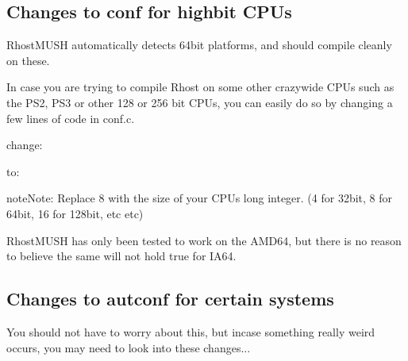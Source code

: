 \documentclass[letterpaper,10pt,english]{sphinxmanual}
\begin{document}
\subsection{Changes to conf for high\sphinxhyphen{}bit CPUs}
\label{\detokenize{troubleshooting:changes-to-conf-for-high-bit-cpus}}
\sphinxAtStartPar
RhostMUSH automatically detects 64\sphinxhyphen{}bit platforms, and should compile
cleanly on these.

\sphinxAtStartPar
In case you are trying to compile Rhost on some other crazy\sphinxhyphen{}wide CPUs
such as the PS2, PS3 or other 128 or 256 bit CPUs, you can easily do
so by changing a few lines of code in conf.c.

\sphinxAtStartPar
change:

\begin{sphinxVerbatim}[commandchars=\\\{\}]
      
              
\end{sphinxVerbatim}

\sphinxAtStartPar
to:

\begin{sphinxVerbatim}[commandchars=\\\{\}]
     
             
\end{sphinxVerbatim}

\begin{sphinxadmonition}{note}{Note:}
\sphinxAtStartPar
Replace 8 with the size of your CPU\textquotesingle{}s long integer. (4 for 32\sphinxhyphen{}bit,
8 for 64\sphinxhyphen{}bit, 16 for 128\sphinxhyphen{}bit, etc etc)
\end{sphinxadmonition}

\sphinxAtStartPar
RhostMUSH has only been tested to work on the AMD64, but there is no
reason to believe the same will not hold true for IA64.


\subsection{Changes to autconf for certain systems}
\label{\detokenize{troubleshooting:changes-to-autconf-for-certain-systems}}
\sphinxAtStartPar
You should not have to worry about this, but incase something really
weird occurs, you may need to look into these changes...
\end{document}
